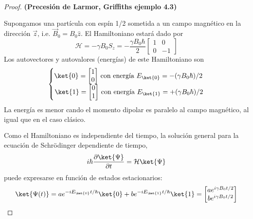 \documentclass[a4paper,11pt]{book} %
\numberwithin{equation}{chapter}
\def\lch{\left\{}
\begin{document}
\begin{proof}
\textbf{(Precesión de Larmor, Griffiths \cite{griffiths_schroeter_2018} ejemplo 4.3)} 

Supongamos una partícula con espín 1/2 sometida a un campo magnético en la dirección $\vec{z}$, i.e. $\vec{B}_0 = B_0 \hat{z}$. El Hamiltoniano estará dado por 
	\begin{equation}
	\mathcal{H} = - \gamma B_0 S_z = - \frac{\gamma B_0 \hbar}{2} 
	\begin{bmatrix}	1 & 0 \\ 0 & -1 \end{bmatrix}
	\end{equation}
Los autovectores y autovalores (energías) de este Hamiltoniano son
	\begin{equation}
	\lch 
	\begin{matrix}
	\ket{0} = \begin{bmatrix} 1 \\ 0 \end{bmatrix} \, 
	\text{con energía } E_{\ket{0}} = - (\gamma B_0 \hbar) /2 \, \\
	\ket{1} = \begin{bmatrix} 0 \\ 1 \end{bmatrix} \, 
	\text{con energía } E_{\ket{1}} = + (\gamma B_0 \hbar) / 2
	\end{matrix}
	\right.
	\end{equation}
La energía es menor cando el momento dipolar es paralelo al campo magnético, al igual que en el caso clásico.

Como el Hamiltoniano es independiente del tiempo, la solución general para la ecuación de Schrödinger dependiente de tiempo,
	\begin{equation} \label{ec_Hardware_NMR_schrodinger}
	i \hbar \frac{\partial \ket{\Psi}}{\partial t} = \mathcal{H} \ket{\Psi}
	\end{equation}
puede expresarse en función de estados estacionarios:
	\begin{equation} \label{ec_Hardware_NMR_schrodinger_sol}
	\ket{\Psi (t)} = a  e^{-i E_{\ket{0}} t/ \hbar} \ket{0} + b  e^{-i E_{\ket{1}} t/ \hbar} \ket{1}  =
	\begin{bmatrix}
	a e ^{i \gamma B_0 t/2} \\
	b e ^{i \gamma B_0 t/2}
	\end{bmatrix}
	\end{equation}


\end{proof}
\end{document}
